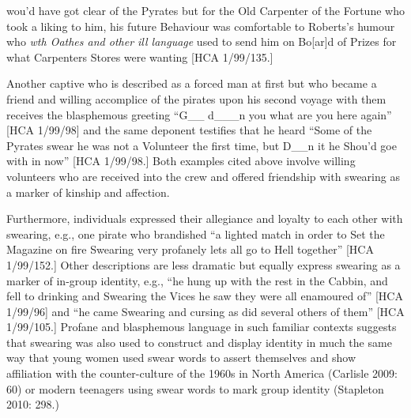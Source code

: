 \begin{styleStandard}
[he] wou’d have got clear of the Pyrates but for the Old Carpenter of the Fortune who took a liking to him, his future Behaviour was comfortable to Roberts’s humour who \textit{wth Oathes and other ill language} used to send him on Bo[ar]d of Prizes for what Carpenters Stores were wanting [HCA 1/99/135.] 
\end{styleStandard}


\begin{styleStandard}
Another captive who is described as a forced man at first but who became a friend and willing accomplice of the pirates upon his second voyage with them receives the blasphemous greeting “G\_\_ d\_\_\_n you what are you here again” [HCA 1/99/98] and the same deponent testifies that he heard “Some of the Pyrates swear he was not a Volunteer the first time, but D\_\_n it he Shou’d goe with in now” [HCA 1/99/98.] Both examples cited above involve willing volunteers who are received into the crew and offered friendship with swearing as a marker of kinship and affection. 
\end{styleStandard}


\begin{styleStandard}
Furthermore, individuals expressed their allegiance and loyalty to each other with swearing, e.g., one pirate who brandished “a lighted match in order to Set the Magazine on fire Swearing very profanely lets all go to Hell together” [HCA 1/99/152.] Other descriptions are less dramatic but equally express swearing as a marker of in-group identity, e.g., “he hung up with the rest in the Cabbin, and fell to drinking and Swearing the Vices he saw they were all enamoured of” [HCA 1/99/96] and “he came Swearing and cursing as did several others of them” [HCA 1/99/105.] Profane and blasphemous language in such familiar contexts suggests that swearing was also used to construct and display identity in much the same way that young women used swear words to assert themselves and show affiliation with the counter-culture of the 1960s in North America (Carlisle 2009: 60) or modern teenagers using swear words to mark group identity (Stapleton 2010: 298.) 
\end{styleStandard}


